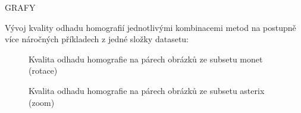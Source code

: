 GRAFY

Vývoj kvality odhadu homografií jednotlivými kombinacemi metod na postupně více náročných
příkladech z jedné složky datasetu:

\begin{figure}[htp] 
	\label{graph_monet}
	\caption{Kvalita odhadu homografie na párech obrázků ze subsetu monet (rotace)}
\end{figure}

\begin{figure}[htp] 
	\label{graph_asterix}
	\caption{Kvalita odhadu homografie na párech obrázků ze subsetu asterix (zoom)}
\end{figure}